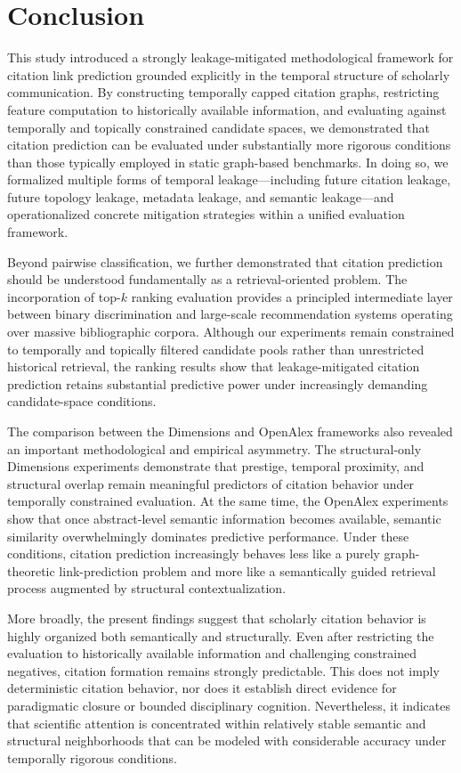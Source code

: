 \documentclass[11pt,a4paper]{article}
\begin{document}
\section{Conclusion}
\label{sec:conclusion}

This study introduced a strongly leakage-mitigated methodological framework for citation link prediction grounded explicitly in the temporal structure of scholarly communication. By constructing temporally capped citation graphs, restricting feature computation to historically available information, and evaluating against temporally and topically constrained candidate spaces, we demonstrated that citation prediction can be evaluated under substantially more rigorous conditions than those typically employed in static graph-based benchmarks. In doing so, we formalized multiple forms of temporal leakage---including future citation leakage, future topology leakage, metadata leakage, and semantic leakage---and operationalized concrete mitigation strategies within a unified evaluation framework.

Beyond pairwise classification, we further demonstrated that citation prediction should be understood fundamentally as a retrieval-oriented problem. The incorporation of top-\(k\) ranking evaluation provides a principled intermediate layer between binary discrimination and large-scale recommendation systems operating over massive bibliographic corpora. Although our experiments remain constrained to temporally and topically filtered candidate pools rather than unrestricted historical retrieval, the ranking results show that leakage-mitigated citation prediction retains substantial predictive power under increasingly demanding candidate-space conditions.

The comparison between the Dimensions and OpenAlex frameworks also revealed an important methodological and empirical asymmetry. The structural-only Dimensions experiments demonstrate that prestige, temporal proximity, and structural overlap remain meaningful predictors of citation behavior under temporally constrained evaluation. At the same time, the OpenAlex experiments show that once abstract-level semantic information becomes available, semantic similarity overwhelmingly dominates predictive performance. Under these conditions, citation prediction increasingly behaves less like a purely graph-theoretic link-prediction problem and more like a semantically guided retrieval process augmented by structural contextualization.

More broadly, the present findings suggest that scholarly citation behavior is highly organized both semantically and structurally. Even after restricting the evaluation to historically available information and challenging constrained negatives, citation formation remains strongly predictable. This does not imply deterministic citation behavior, nor does it establish direct evidence for paradigmatic closure or bounded disciplinary cognition. Nevertheless, it indicates that scientific attention is concentrated within relatively stable semantic and structural neighborhoods that can be modeled with considerable accuracy under temporally rigorous conditions.
\end{document}
